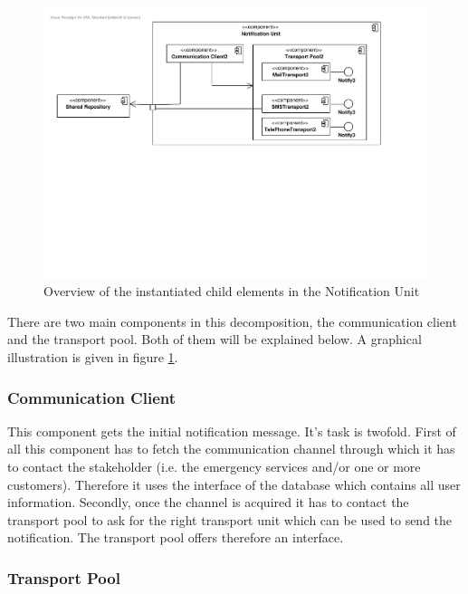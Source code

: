 \begin{figure}[H]
	\begin{centering}
		\includegraphics[width=\textwidth]{figs/add-it7-elements.pdf}
		\caption{Overview of the instantiated child elements in the Notification Unit}
		\label{fig:it7/elements}
	\end{centering}
\end{figure}

\npar There are two main components in this decomposition, the communication
client and the transport pool. Both of them will be explained below. A graphical
illustration is given in figure \ref{fig:it7/elements}.

\subsubsection{Communication Client} 
\npar This component gets the initial notification message. It's task is
twofold. First of all this component has to fetch the communication channel
through which it has to contact the stakeholder (i.e. the emergency services
and/or one or more customers). Therefore it uses the 
interface of the database which contains all user information. Secondly, once
the channel is acquired it has to contact the transport pool to ask for the
right transport unit which can be used to send the notification. The transport
pool offers therefore an  interface.

\subsubsection{Transport Pool}

